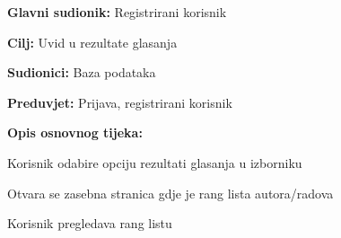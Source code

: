 					\noindent {}
					\begin{packed_item}
						
						\item \textbf{Glavni sudionik: } Registrirani korisnik
						\item  \textbf{Cilj:} Uvid u rezultate glasanja
						\item  \textbf{Sudionici:} Baza podataka
						\item  \textbf{Preduvjet:} Prijava, registrirani korisnik
						\item  \textbf{Opis osnovnog tijeka:}
						
						\item[] \begin{packed_enum}
							
							\item Korisnik odabire opciju rezultati glasanja u izborniku
							\item Otvara se zasebna stranica gdje je rang lista autora/radova
							\item Korisnik pregledava rang listu
						\end{packed_enum}
						
					\end{packed_item}
					
